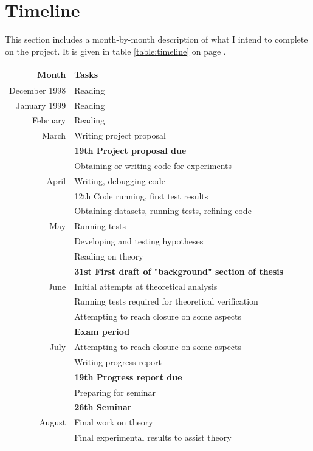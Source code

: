 \section{Timeline}
This section includes a month-by-month description of what I intend to
complete on the project.  It is given in table \ref{table:timeline} on
page \pageref{table:timeline}.

\begin{table}
\begin{tabular}{r l}
\textbf{Month}		& \textbf{Tasks} \\ \hline \hline
December 1998		& Reading \\ \hline
January 1999		& Reading \\ \hline
February 		& Reading \\ \hline
March			& Writing project proposal \\
			& \textbf{19th Project proposal due} \\
			& Obtaining or writing code for experiments \\ \hline
April			& Writing, debugging code \\
			& 12th Code running, first test results \\
			& Obtaining datasets, running tests, refining
			  code  \\ \hline
May			& Running tests \\
			& Developing and testing hypotheses \\
			& Reading on theory \\
			& \textbf{31st First draft of "background"
			  section of thesis} \\ \hline
June			& Initial attempts at theoretical analysis \\
			& Running tests required for theoretical
			  verification \\
			& Attempting to reach closure on some aspects \\
			& \textbf{Exam period} \\ \hline
July			& Attempting to reach closure on some aspects \\
			& Writing progress report \\
			& \textbf{19th Progress report due} \\
			& Preparing for seminar \\
			& \textbf{26th Seminar} \\ \hline
August			& Final work on theory \\
			& Final experimental results to assist theory \\

\end{tabular}
\end{table}
